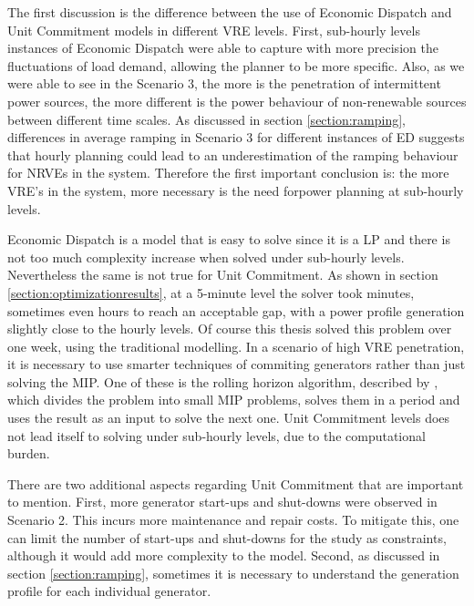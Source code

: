 \documentclass[12pt,LUDisStyle,twosided]{book}
\begin{document}
The first discussion is the difference between the use of Economic Dispatch and Unit Commitment models in different VRE levels. First, sub-hourly levels instances of Economic Dispatch were able to capture with more precision the fluctuations of load demand, allowing the planner to be more specific. Also, as we were able to see in the Scenario 3, the more is the penetration of intermittent power sources, the more different is the power behaviour of non-renewable sources between different time scales. As discussed in section \ref{section:ramping}, differences in average ramping in Scenario 3 for different instances of ED suggests that hourly planning could lead to an underestimation of the ramping behaviour for NRVEs in the system. Therefore the first important conclusion is: the more VRE's in the system, more necessary is the need forpower planning at sub-hourly levels.

Economic Dispatch is a model that is easy to solve since it is a LP and there is not too much complexity increase when solved under sub-hourly levels. Nevertheless the same is not true for Unit Commitment. As shown in section \ref{section:optimizationresults}, at a 5-minute level the solver took minutes, sometimes even hours to reach an acceptable gap, with a power profile generation slightly close to the hourly levels. Of course this thesis solved this problem over one week, using the traditional modelling. In a scenario of high VRE penetration, it is necessary to use smarter techniques of commiting generators rather than just solving the MIP. One of these is the rolling horizon algorithm, described by \citeauthor{tuohy} \cite{tuohy}, which divides the problem into small MIP problems, solves them in a period and uses the result as an input to solve the next one. Unit Commitment levels does not lead itself to solving under sub-hourly levels, due to the computational burden. 

There are two additional aspects regarding Unit Commitment that are important to mention. First, more generator start-ups and shut-downs were observed in Scenario 2. This incurs more maintenance and repair costs. To mitigate this, one can limit the number of start-ups and shut-downs for the study as constraints, although it would add more complexity to the model. Second, as discussed in section \ref{section:ramping}, sometimes it is necessary to understand the generation profile for each individual generator.
\end{document}
